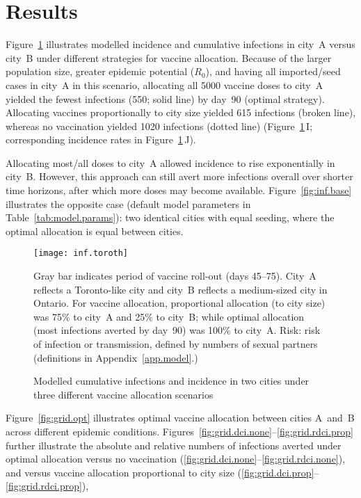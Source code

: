 \section{Results}
Figure~\ref{fig:inf.toroth} illustrates modelled \MPXV incidence and cumulative infections
in city~A versus city~B under different strategies for vaccine allocation.
Because of the larger population size,
greater epidemic potential ($R_0$), and
having all imported/seed cases in city~A in this scenario,
allocating all 5000 vaccine doses to city~A
yielded the fewest infections (550; solid line) by day~90 (optimal strategy). %
Allocating vaccines proportionally to city size yielded 615 infections (broken line),
whereas no vaccination yielded 1020 infections (dotted line)
(Figure~\ref{fig:inf.toroth}\,I; corresponding incidence rates in Figure~\ref{fig:inf.toroth}\,J).
\par
Allocating most/all doses to city~A
allowed incidence to rise exponentially in city~B.
However, this approach can still avert more infections overall over shorter time horizons,
after which more doses may become available.
Figure~\ref{fig:inf.base} illustrates the opposite case
(default model parameters in Table~\ref{tab:model.params}): two identical cities with equal seeding,
where the optimal allocation is equal between cities.
\begin{figure}[h]
  \centerline{\texttt{[image: inf.toroth]}}
  \caption{Modelled \MPXV cumulative infections and incidence in two cities
    under three different vaccine allocation scenarios}
  \label{fig:inf.toroth}
  \floatfoot
  Gray bar indicates period of vaccine roll-out (days 45--75).
  City~A reflects a Toronto-like city and city~B reflects a medium-sized city in Ontario.
  For vaccine allocation,
  proportional allocation (to city size) was 75\% to city~A and 25\% to city~B; while
  optimal allocation (most infections averted by day~90) was 100\% to city~A.
  Risk: risk of \MPXV infection or transmission, defined by
  numbers of sexual partners (definitions in Appendix~\ref{app.model}.)
\end{figure}
\par
Figure~\ref{fig:grid.opt} illustrates optimal vaccine allocation between cities A~and~B
across different epidemic conditions.
Figures~\ref{fig:grid.dci.none}--\ref{fig:grid.rdci.prop} further illustrate the
absolute and relative numbers of infections averted under optimal allocation
versus no vaccination (\ref{fig:grid.dci.none}--\ref{fig:grid.rdci.none}), and
versus vaccine allocation proportional to city size (\ref{fig:grid.dci.prop}--\ref{fig:grid.rdci.prop}),
